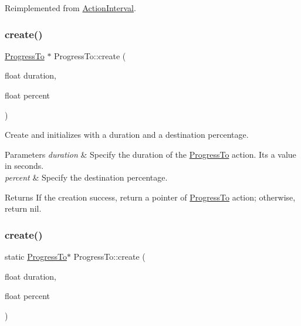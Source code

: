Reimplemented from \hyperlink{classActionInterval_abc93ce0c2f54a90eb216a7803f25f44a}{Action\+Interval}.

\mbox{\label{classProgressTo_ac6129d29666546255f5462b5e5bf471f}} 
\subsubsection{\texorpdfstring{create()}{create()}\hspace{0.1cm}{\footnotesize\ttfamily [1/2]}}
{\footnotesize\ttfamily \hyperlink{classProgressTo}{Progress\+To} $\ast$ Progress\+To\+::create (\begin{DoxyParamCaption}\item[{float}]{duration,  }\item[{float}]{percent }\end{DoxyParamCaption})\hspace{0.3cm}{\ttfamily [static]}}



Create and initializes with a duration and a destination percentage. 


\begin{DoxyParams}{Parameters}
{\em duration} & Specify the duration of the \hyperlink{classProgressTo}{Progress\+To} action. It\textquotesingle{}s a value in seconds. \\
\hline
{\em percent} & Specify the destination percentage. \\
\hline
\end{DoxyParams}
\begin{DoxyReturn}{Returns}
If the creation success, return a pointer of \hyperlink{classProgressTo}{Progress\+To} action; otherwise, return nil. 
\end{DoxyReturn}
\mbox{\label{classProgressTo_a2c8c9ee63137e50754cb231c3fdd4f5d}} 
\subsubsection{\texorpdfstring{create()}{create()}\hspace{0.1cm}{\footnotesize\ttfamily [2/2]}}
{\footnotesize\ttfamily static \hyperlink{classProgressTo}{Progress\+To}$\ast$ Progress\+To\+::create (\begin{DoxyParamCaption}\item[{float}]{duration,  }\item[{float}]{percent }\end{DoxyParamCaption})\hspace{0.3cm}{\ttfamily [static]}}



